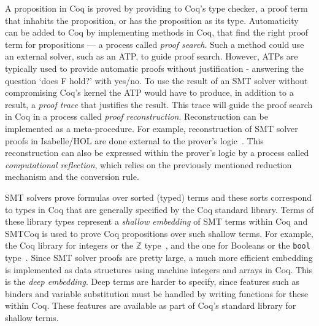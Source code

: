 \documentclass{article}
\begin{document}
	A proposition in Coq is proved by 
	providing to Coq's type checker, a 
	proof term that inhabits the 
	proposition, or has the proposition 
	as its type. Automaticity can be 
	added to Coq by implementing 
	methods in Coq, that find the right 
	proof term for propositions --- a 
	process called \textit{proof search}. 
	Such a method could use an external 
	solver, such as an ATP, to guide 
	proof search. However, ATPs are 
	typically used to provide automatic 
	proofs without justification - 
	answering the question `does F 
	hold?' with	yes/no. To use the 
	result of an SMT solver without 
	compromising Coq's kernel the ATP 
	would have to produce, in addition 
	to a result, a \textit{proof trace} 
	that justifies the result. This 
	trace will guide the proof search 
	in Coq in a process called 
	\textit{proof reconstruction}. 
	Reconstruction can be implemented 
	as a meta-procedure. For example, 
	reconstruction of SMT solver proofs 
	in Isabelle/HOL are done external to 
	the prover's logic~\cite{bohme}. 
	This reconstruction can also be 
	expressed within the prover's logic 
	by a process called 
	\textit{computational reflection}, 
	which relies on the previously 
	mentioned reduction mechanism and 
	the conversion rule.

	SMT solvers prove formulas over 
	sorted (typed) terms and these 
	sorts correspond to types in 
	Coq that are generally 
	specified by the Coq standard 
	library. Terms of these library 
	types represent a \textit{shallow 
	embedding} of SMT terms within 
	Coq and SMTCoq is used to prove 
	Coq propositions over such 
	shallow terms. For example, the 
	Coq library for integers or 
	the $\mathbb{Z}$ type~\cite{CoqZ},
	and the one for Booleans or the 
	\texttt{bool} type~\cite{CoqBool}.
	Since SMT solver proofs are pretty 
	large, a much 
	more efficient embedding is 
	implemented as data structures 
	using machine integers and arrays 
	in Coq. This is the 
	\textit{deep embedding}. Deep 
	terms are harder to specify, 
	since features such as binders 
	and variable substitution must be 
	handled by writing functions 
	for these within Coq. These 
	features are available as part 
	of Coq's standard library 
	for shallow terms. 
	
\end{document}
